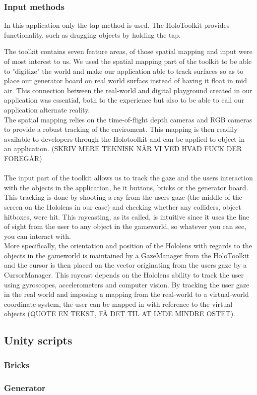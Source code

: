 \subsubsection{Input methods}
In this application only the tap method is used. The HoloToolkit provides functionality, such as dragging objects by holding the tap. 

The toolkit contains seven feature areas, of those spatial mapping and input were of most interest to us. We used the spatial mapping part of the toolkit to be able to "digitize" the world and make our application able to track surfaces so as to place our generator board on real world surfacs instead of having it float in mid air. This connection between the real-world and digital playground created in our application was essential, both to the experience but also to be able to call our application alternate reality.\\
The spatial mapping relies on the time-of-flight depth cameras and RGB cameras to provide a robust tracking of the enviroment. This mapping is then readily available to developers through the Holotoolkit and can be applied to object in an application.
(SKRIV MERE TEKNISK NÅR VI VED HVAD FUCK DER FOREGÅR) 
\\\\
The input part of the toolkit allows us to track the gaze and the users interaction with the objects in the application, be it buttons, bricks or the generator board. This tracking is done by shooting a ray from the users gaze (the middle of the screen on the Hololens in our case) and checking whether any colliders, object hitboxes, were hit. This raycasting, as its called, is intuitive since it uses the line of sight from the user to any object in the gameworld, so whatever you can see, you can interact with.\\
More specifically, the orientation and position of the Hololens with regards to the objects in the gameworld is maintained by a GazeManager from the HoloToolkit and the cursor is then placed on the vector originating from the users gaze by a CursorManager. This raycast depends on the Hololens ability to track the user using gyroscopes, accelerometers and computer vision. By tracking the user gaze in the real world and imposing a mapping from the real-world to a virtual-world coordinate system, the user can be mapped in with reference to the virtual objects (QUOTE EN TEKST, FÅ DET TIL AT LYDE MINDRE OSTET). 

\subsection{Unity scripts}
\subsubsection{Bricks}
\subsubsection{Generator}